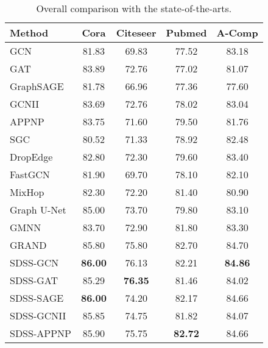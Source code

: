 \documentclass[letterpaper]{article} \usepackage{aaai22} \usepackage{times} \usepackage{helvet} \usepackage{courier} \usepackage[hyphens]{url} \usepackage{graphicx} \urlstyle{rm} \def\UrlFont{\rm} \usepackage{subfigure}
\begin{document}
	
	\begin{table}[htbp]
		\centering
		\begin{tabular}{lcccc}
			\hline
			Method & Cora & Citeseer & Pubmed & A-Comp \\ \hline
			GCN & 81.83 & 69.83 & 77.52 & 83.18 \\
			GAT & 83.89 & 72.76 & 77.02 & 81.07 \\
			GraphSAGE & 81.78 & 66.96 & 77.36 & 77.60 \\
			GCNII & 83.69 & 72.76 & 78.02 & 83.04 \\
			APPNP & 83.75 & 71.60 & 79.50 & 81.76 \\
			SGC & 80.52 & 71.33 & 78.92 & 82.48 \\
			DropEdge & 82.80 & 72.30 & 79.60 & 83.40 \\
			FastGCN & 81.90 & 69.70 & 78.10 & 82.10 \\
			MixHop & 82.30 & 72.20 & 81.40 & 80.90 \\
			Graph U-Net & 85.00 & 73.70 & 79.80 & 83.10 \\
			GMNN & 83.70 & 72.90 & 81.80 & 83.30 \\
			GRAND & 85.80 & 75.80 & 82.70 & 84.70 \\\hline
			SDSS-GCN &\textbf{ 86.00} & 76.13 & 82.21 & \textbf{84.86} \\ 
			SDSS-GAT & 85.29 & \textbf{76.35} & 81.46 & 84.02 \\
			SDSS-SAGE & \textbf{86.00} & 74.20 & 82.17 & 84.66 \\
			SDSS-GCNII & 85.85 & 74.75 & 81.82 & 84.07 \\
			SDSS-APPNP & 85.90 & 75.75 & \textbf{82.72} & 84.66 \\ \hline
		\end{tabular}
		\caption{Overall comparison with the state-of-the-arts.}
		\label{tab:Sota}
	\end{table}
	
\end{document}

